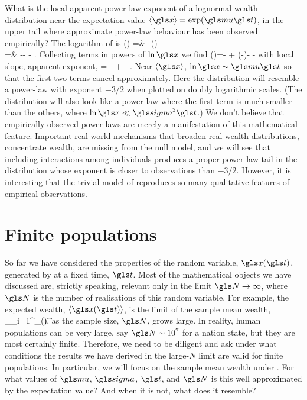 What is the local apparent power-law exponent of a lognormal wealth distribution near the 
expectation value $\ave{\x}=\exp(\gmu \t)$, \ie in the upper tail where approximate power-law behaviour
has been observed empirically? The logarithm of  is
\bea
\ln \PDF(\x) =& -\ln\left(\x{}\right) -\\
=& -\ln \x - - .
\eea
Collecting terms in powers of $\ln \x$ we find
\be
\ln \PDF(\x)=-  + \left(-\right)\ln \x - -
\ee
with local slope, \ie apparent exponent,
\be
\frac{\gd\ln \PDF(\x)}{\gd \ln \x} = - \frac{\ln \x}{\gsigma^2 \t}  +  - .
\ee
Near $\ave{\x}$, $\ln \x \sim \gmu \t$ so that the first two terms cancel approximately. Here the distribution will resemble a power-law with exponent $-3/2$ when plotted on doubly logarithmic scales. (The distribution will also look like a power law where the first term is much smaller than the others, \eg where $\ln \x \ll \gsigma^2 \t$.) We don't believe that empirically observed power laws are merely a manifestation of this mathematical feature. Important real-world  mechanisms that broaden real wealth distributions, \ie concentrate wealth, are missing from the null model, and we will see that including interactions among individuals produces a proper power-law tail in the distribution whose exponent is closer to observations than $-3/2$. However, it is interesting that the trivial model of \GBM reproduces so many qualitative features of empirical observations. 


\section{Finite populations}
So far we have considered the properties of the random variable, $\x(\t)$, generated by \GBM at a fixed time, $\t$. Most of the mathematical objects we have discussed are, strictly speaking, relevant only in the limit $\N\to\infty$, where $\N$ is the number of realisations of this random variable. For example, the expected wealth, $\ave{\x(\t)}$, is the limit of the sample mean wealth,
\be
\ave{\x(\t)}_\N \equiv {}\sum_{i=1}^\N \x_\gi(\t),
\ee
as the sample size, $\N$, grows large. In reality, human populations can be very large, say $\N\sim10^7$ for a nation state, but they are most certainly finite. Therefore, we need to be diligent and ask under what conditions the results we have derived in the large-$N$ limit are valid for finite populations. In particular, we will focus on the sample mean wealth under \GBM. For what values of $\gmu$, $\gsigma$, $\t$, and $\N$ is this well approximated by the expectation value? And when it is not, what does it resemble?

